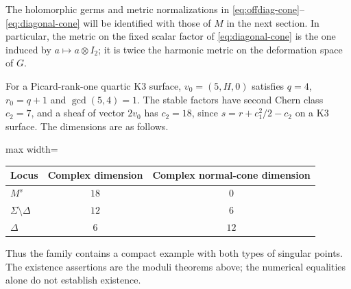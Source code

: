 The holomorphic germs and metric normalizations in
\eqref{eq:offdiag-cone}--\eqref{eq:diagonal-cone} will be identified
with those of $M$ in the next section. In particular, the metric
on the fixed scalar factor of \eqref{eq:diagonal-cone} is the
one induced by $a\mapsto a\otimes I_2$; it is twice the harmonic
metric on the deformation space of $G$.

\begin{example}\label{ex:quartic}
For a Picard-rank-one quartic K3 surface, $v_0=(5,H,0)$ satisfies
$q=4$, $r_0=q+1$ and $\gcd(5,4)=1$. The stable factors have
second Chern class $c_2=7$, and a sheaf of vector $2v_0$ has
$c_2=18$, since $s=r+c_1^2/2-c_2$ on a K3 surface. The
dimensions are as follows.
\begin{center}
\begin{adjustbox}{max width=\textwidth}
\begin{tabular}{lcc}
\toprule
Locus & Complex dimension & Complex normal-cone dimension\\
\midrule
$M^s$ & $18$ & $0$\\
$\Sigma\setminus\Delta$ & $12$ & $6$\\
$\Delta$ & $6$ & $12$\\
\bottomrule
\end{tabular}
\end{adjustbox}
\end{center}
Thus the family contains a compact example with both types of
singular points. The existence assertions are the moduli
theorems above; the numerical equalities alone do not establish
existence.
\end{example}
